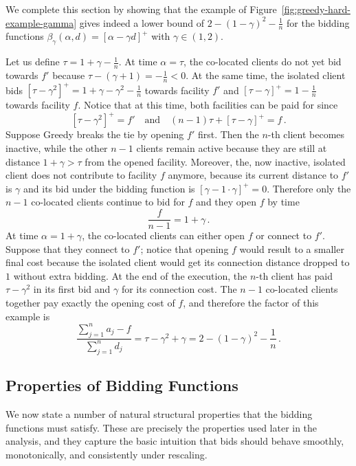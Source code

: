 \vspace{1em}

We complete this section by showing that the example of Figure~\ref{fig:greedy-hard-example-gamma} gives indeed a lower bound of $2-(1-\gamma)^2-\frac1n$ for the bidding functions $\beta_\gamma(\alpha,d) = [\alpha - \gamma d]^+$ with $\gamma \in (1,2)$.


\noindent Let us define $\tau = 1+\gamma-\frac1n.$ At time $\alpha = \tau$, the co-located
clients do not yet bid towards $f'$ because $\tau - (\gamma+1) = -\frac1n < 0$.
At the same time, the isolated client bids $[\tau-\gamma^2]^+ = 1+\gamma-\gamma^2-\frac1n$ towards facility $f'$ and $[\tau-\gamma]^+ = 1-\frac1n$ towards facility $f$. Notice that at this time, both facilities can be paid for since
$$
[\tau-\gamma^2]^+ = f' \quad\text{and}\quad (n-1)\tau + [\tau-\gamma]^+ = f\,.
$$
\noindent Suppose Greedy breaks the tie by opening $f'$ first. Then the $n$-th client becomes inactive, while the other $n-1$ clients remain active because they are still at distance $1+\gamma > \tau$ from the opened facility. Moreover, the, now inactive, isolated client does not contribute to facility $f$ anymore, because its current distance to $f'$ is $\gamma$
and its bid under the bidding function is $[\gamma - 1\cdot\gamma]^+ = 0$. 
Therefore only the $n-1$ co-located clients continue to bid for $f$ and they open $f$ by time
\[
    \frac{f}{n-1} = 1+\gamma\,.
\]
At time $\alpha = 1+\gamma$, the co-located clients can either open $f$ or connect to $f'$.
Suppose that they connect to $f'$; notice that opening $f$ would result to a smaller final cost
because the isolated client would get its connection distance dropped to $1$ without extra bidding.
At the end of the execution, the $n$-th client has paid $\tau-\gamma^2$ in its first bid and
$\gamma$ for its connection cost. The $n-1$ co-located clients together pay exactly the opening cost of $f$, and therefore the factor of this example is
$$
\frac{\sum_{j = 1}^n a_j - f}{\sum_{j = 1}^n d_j} = \tau - \gamma^2 + \gamma = 2-(1-\gamma)^2 -\frac1n\,.
$$

\subsection{Properties of Bidding Functions}\label{sec:natural-properties-bidding}

We now state a number of natural structural properties that the bidding functions must satisfy. 
These are precisely the properties used later in the analysis, and they capture the basic 
intuition that bids should behave smoothly, monotonically, and consistently under rescaling.

